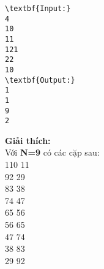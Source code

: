\begin{verbatim}
\textbf{Input:}
4
10
11
121
22
10
\textbf{Output:}
1
1
9
2\end{verbatim}

\textbf{Giải thích:}
\\Với\textbf{ N=9} có các cặp sau:
\\110 11
\\92 29
\\83 38
\\74 47
\\65 56
\\56 65
\\47 74
\\38 83
\\29 92

 